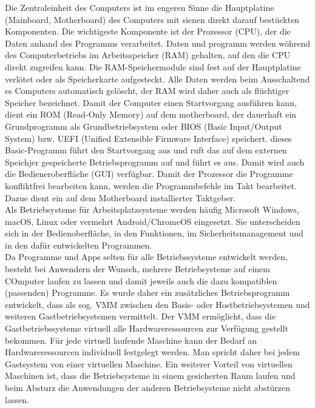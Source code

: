 \documentclass[a4paper, 12pt]{report}
\begin{document}
Die Zentraleinheit des Computers ist im engeren Sinne die Hauptplatine
(Mainboard, Motherboard) des Computers mit sienen direkt darauf bestückten
Komponenten. Die wichtigeste Komponente ist der Prozessor (CPU), der die Daten
anhand des Programms verarbeitet. Daten und programm werden wöhrend des
Computerbetriebs im Arbeitsspeicher (RAM) gehalten, auf den die CPU direkt
zugreifen kann. %
Die RAM-Speichermodule sind fest auf der Hauptplatine verlötet oder als
Speicherkarte aufgesteckt. Alle Daten werden beim Ausschaltend es Computers
automatisch gelöscht, der RAM wird daher auch als flüchtiger Speicher
bezeichnet. %
Damit der Computer einen Startvorgang ausführen kann, dient ein ROM (Read-Only
Memory) auf dem motherboard, der dauerhaft ein Grundprogramm als
Grundbetriebsystem oder BIOS (Basic Input/Output System) bzw. UEFI (Unified
Extensible Firmware Interface) speichert. dieses Basic-Programm führt den
Startvorgang aus und ruft das auf dem externen Speichjer gespeicherte
Betriebsprogramm auf und führt es aus. Damit wird auch die Bedieneroberfläche
(GUI) verfügbar. Damit der Prozessor die Programme konfliktfrei bearbeiten kann,
werden die Programmbefehle im Takt bearbeitet. Dazue dient ein auf dem
Motherboard installierter Taktgeber. \\

Als Betriebsysteme für Arbeitsplatzsysteme werden häufig Microsoft Windows,
macOS, Linux oder vermehrt Android/ChromeOS eingesetzt. Sie unterscheiden sich
in der Bedienoberfläche, in den Funktionen, im Sicherheitsmanagement und in den
dafür entwickelten Programmen. \\

Da Programme und Apps selten für alle Betriebssysteme entwickelt werden, besteht
bei Anwendern der Wunsch, mehrere Betriebsysteme auf einem COmputer laufen zu
lassen und damit jeweils auch die dazu kompatiblen (passenden) Programme. Es
wurde daher ein zusätzliches Betriebsprogramm entwickelt, dass als sog. VMM
zwischen den Basis- oder Hostbetriebsystemen und weiteren Gastbetriebsystemen
vermittelt. Der VMM ermöglicht, dass die Gastbetriebssysteme virtuell alle
Hardwareressourcen zur Verfügung gestellt bekommen. Für jede virtuell laufende
Maschine kann der Bedarf an Hardwareressourcen individuell festgelegt werden.
Man spricht daher bei jedem Gastsystem von einer virtuellen Maschine. Ein
weiterer Vorteil von virtuellen Maschinen ist, dass die Betriebsysteme in einem
gesicherten Raum laufen und beim Absturz die Anwendungen der anderen
Betriebsysteme nicht abstürzen lassen.
\end{document}
